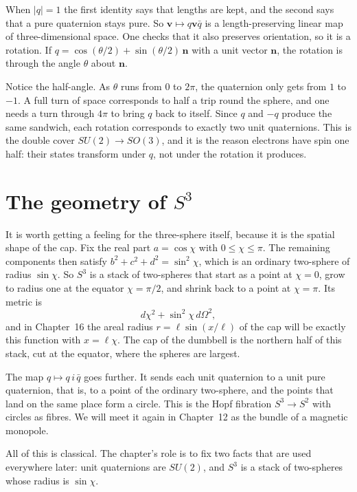 When $|q|=1$ the first identity says that lengths are kept, and the second says that a pure quaternion stays pure. So $\mathbf v\mapsto q\mathbf v\bar q$ is a length-preserving linear map of three-dimensional space. One checks that it also preserves orientation, so it is a rotation. If $q=\cos(\theta/2)+\sin(\theta/2)\,\mathbf n$ with a unit vector $\mathbf n$, the rotation is through the angle $\theta$ about $\mathbf n$.

Notice the half-angle. As $\theta$ runs from $0$ to $2\pi$, the quaternion only gets from $1$ to $-1$. A full turn of space corresponds to half a trip round the sphere, and one needs a turn through $4\pi$ to bring $q$ back to itself. Since $q$ and $-q$ produce the same sandwich, each rotation corresponds to exactly two unit quaternions. This is the double cover $SU(2)\to SO(3)$, and it is the reason electrons have spin one half: their states transform under $q$, not under the rotation it produces.

\section{The geometry of $S^3$}

It is worth getting a feeling for the three-sphere itself, because it is the spatial shape of the cap. Fix the real part $a=\cos\chi$ with $0\le\chi\le\pi$. The remaining components then satisfy $b^2+c^2+d^2=\sin^2\chi$, which is an ordinary two-sphere of radius $\sin\chi$. So $S^3$ is a stack of two-spheres that start as a point at $\chi=0$, grow to radius one at the equator $\chi=\pi/2$, and shrink back to a point at $\chi=\pi$. Its metric is
\[
d\chi^2+\sin^2\chi\,d\Omega^2 ,
\]
and in Chapter~16 the areal radius $r=\ell\sin(x/\ell)$ of the cap will be exactly this function with $x=\ell\chi$. The cap of the dumbbell is the northern half of this stack, cut at the equator, where the spheres are largest.

The map $q\mapsto q\,i\,\bar q$ goes further. It sends each unit quaternion to a unit pure quaternion, that is, to a point of the ordinary two-sphere, and the points that land on the same place form a circle. This is the Hopf fibration $S^3\to S^2$ with circles as fibres. We will meet it again in Chapter~12 as the bundle of a magnetic monopole.

\begin{standsbox}
All of this is classical. The chapter's role is to fix two facts that are used everywhere later: unit quaternions are $SU(2)$, and $S^3$ is a stack of two-spheres whose radius is $\sin\chi$.
\end{standsbox}

